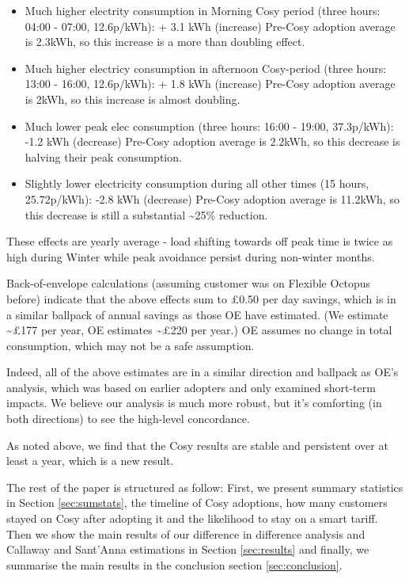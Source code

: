 \documentclass[
]{article}
\providecommand{\tightlist}{%
  \setlength{\itemsep}{0pt}\setlength{\parskip}{0pt}}
\begin{document}
\begin{itemize}
\tightlist
\item
  Much higher electrity consumption in Morning Cosy period (three hours: 04:00 - 07:00, 12.6p/kWh): + 3.1 kWh (increase)
  Pre-Cosy adoption average is 2.3kWh, so this increase is a more than doubling effect.
\item
  Much higher electricy consumption in afternoon Cosy-period (three hours: 13:00 - 16:00, 12.6p/kWh): + 1.8 kWh (increase)
  Pre-Cosy adoption average is 2kWh, so this increase is almost doubling.
\item
  Much lower peak elec consumption (three hours: 16:00 - 19:00, 37.3p/kWh): -1.2 kWh (decrease)
  Pre-Cosy adoption average is 2.2kWh, so this decrease is halving their peak consumption.
\item
  Slightly lower electricity consumption during all other times (15 hours, 25.72p/kWh):
  -2.8 kWh (decrease)
  Pre-Cosy adoption average is 11.2kWh, so this decrease is still a substantial \textasciitilde25\% reduction.
\end{itemize}

These effects are yearly average - load shifting towards off peak time is twice as high during Winter while peak avoidance persist during non-winter months.

Back-of-envelope calculations (assuming customer was on Flexible Octopus before) indicate that the above effects sum to £0.50 per day savings, which is in a similar ballpack of annual savings as those OE have estimated. (We estimate \textasciitilde£177 per year, OE estimates \textasciitilde£220 per year.) OE assumes no change in total consumption, which may not be a safe assumption.

Indeed, all of the above estimates are in a similar direction and ballpack as OE's analysis, which was based on earlier adopters and only examined short-term impacts. We believe our analysis is much more robust, but it's comforting (in both directions) to see the high-level concordance.

As noted above, we find that the Cosy results are stable and persistent over at least a year, which is a new result.

The rest of the paper is structured as follow: First, we present summary statistics in Section \ref{sec:sumstats}, the timeline of Cosy adoptions, how many customers stayed on Cosy after adopting it and the likelihood to stay on a smart tariff. Then we show the main results of our difference in difference analysis and Callaway and Sant'Anna estimations in Section \ref{sec:results} and finally, we summarise the main results in the conclusion section \ref{sec:conclusion}.
\end{document}
